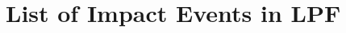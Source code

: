 \documentclass[preprint, trackchanges]{aastex61}
\newcommand\aastex{AAS\TeX}
\begin{document}


 \appendix
 \section{List of Impact Events in LPF}









\listofchanges
\end{document}
